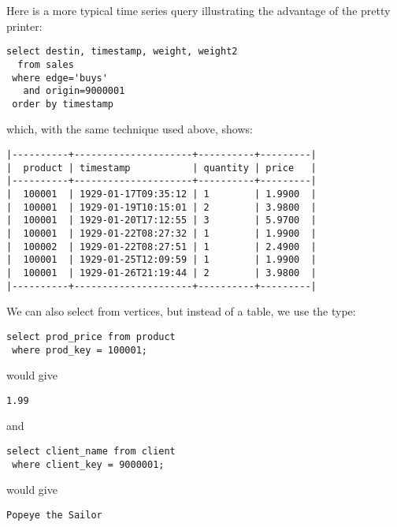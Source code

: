 Here is a more typical time series query illustrating
the advantage of the pretty printer:

\begin{sqlcode}
\begin{lstlisting}
select destin, timestamp, weight, weight2
  from sales 
 where edge='buys' 
   and origin=9000001 
 order by timestamp
\end{lstlisting}
\end{sqlcode}

which, with the same technique used above, shows:

\begin{verbatim}
|----------+---------------------+----------+---------|
|  product | timestamp           | quantity | price   |
|----------+---------------------+----------+---------|
|  100001  | 1929-01-17T09:35:12 | 1        | 1.9900  |
|  100001  | 1929-01-19T10:15:01 | 2        | 3.9800  |
|  100001  | 1929-01-20T17:12:55 | 3        | 5.9700  |
|  100001  | 1929-01-22T08:27:32 | 1        | 1.9900  |
|  100002  | 1929-01-22T08:27:51 | 1        | 2.4900  |
|  100001  | 1929-01-25T12:09:59 | 1        | 1.9900  |
|  100001  | 1929-01-26T21:19:44 | 2        | 3.9800  |
|----------+---------------------+----------+---------|
\end{verbatim}

We can also select from vertices,
but instead of a table, we use the type:

\begin{sqlcode}
\begin{lstlisting}
select prod_price from product
 where prod_key = 100001;
\end{lstlisting}
\end{sqlcode}

would give
\begin{verbatim}
1.99
\end{verbatim}

and

\begin{sqlcode}
\begin{lstlisting}
select client_name from client
 where client_key = 9000001;
\end{lstlisting}
\end{sqlcode}

would give
\begin{verbatim}
Popeye the Sailor
\end{verbatim}



